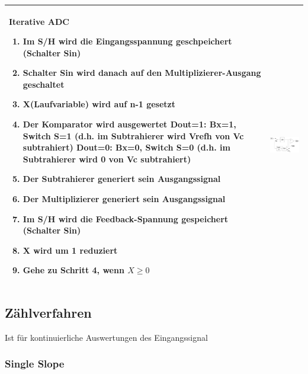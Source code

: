 \begin{longtable}{|p{12cm}|c|}
  {\textbf{Iterative ADC}
  \begin{enumerate}
    \item Im S/H wird die Eingangsspannung geschpeichert (Schalter Sin)
    \item Schalter Sin wird danach auf den Multiplizierer-Ausgang geschaltet
    \item X(Laufvariable) wird auf n-1 gesetzt
    \item Der Komparator wird ausgewertet\newline
      Dout=1: Bx=1, Switch S=1 (d.h. im Subtrahierer wird Vrefh von Vc
      subtrahiert)\newline
      Dout=0: Bx=0, Switch S=0 (d.h. im Subtrahierer wird 0 von Vc
      subtrahiert)
    \item Der Subtrahierer generiert sein Ausgangssignal
    \item Der Multiplizierer generiert sein Ausgangssignal
    \item Im S/H wird die Feedback-Spannung gespeichert (Schalter Sin)
    \item X wird um 1 reduziert
    \item Gehe zu Schritt 4, wenn $X\geq0$
  \end{enumerate}
  }
  &
  \includegraphics[width=6cm, valign=t]{pictures/iterativeADC}\\
\hline
\end{longtable}



\subsection{Zählverfahren } 
Ist für kontinuierliche Auswertungen des Eingangssignal
\subsubsection{Single Slope}

